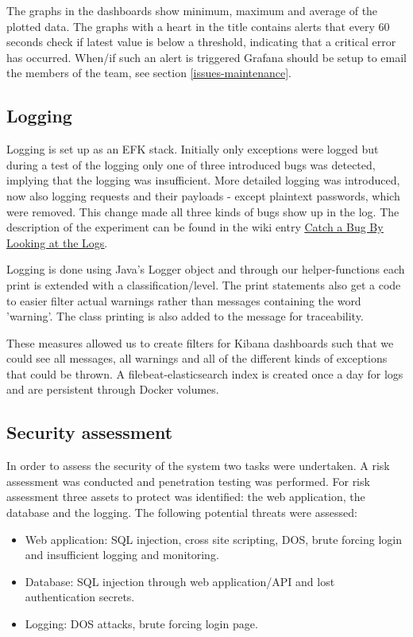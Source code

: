 The graphs in the dashboards show minimum, maximum and average of the plotted data. The graphs with a heart in the title contains alerts that every 60 seconds check if latest value is below a threshold, indicating that a critical error has occurred. When/if such an alert is triggered Grafana should be setup to email the members of the team, see section \ref{issues-maintenance}.

\subsection{Logging}
\label{subsection:logging}
Logging is set up as an EFK stack. Initially only exceptions were logged but during a test of the logging only one of three introduced bugs was detected, implying that the logging was insufficient. More detailed logging was introduced, now also logging requests and their payloads - except plaintext passwords, which were removed. This change made all three kinds of bugs show up in the log. The description of the experiment can be found in the wiki entry \underline{\href{https://github.com/DevOps2021-gb/devops2021/wiki/Catch-a-Bug-By-Looking-at-the-Logs}{Catch a Bug By Looking at the Logs}}.

Logging is done using Java's Logger object and through our helper-functions each print is extended with a classification/level. The print statements also get a code to easier filter actual warnings rather than messages containing the word 'warning'. The class printing is also added to the message for traceability.

These measures allowed us to create filters for Kibana dashboards such that we could see all messages, all warnings and all of the different kinds of exceptions that could be thrown. A filebeat-elasticsearch index is created once a day for logs and are persistent through Docker volumes. 


\subsection{Security assessment}
In order to assess the security of the system two tasks were undertaken. A risk assessment was conducted and penetration testing was performed. For risk assessment three assets to protect was identified: the web application, the database and the logging. The following potential threats were assessed:
\begin{itemize}
    \item Web application: SQL injection, cross site scripting, DOS, brute forcing login and insufficient logging and monitoring.
    \item Database: SQL injection through web application/API and lost authentication secrets.
    \item Logging: DOS attacks, brute forcing login page.
\end{itemize}

